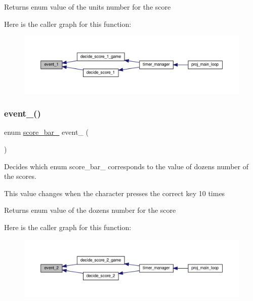 \begin{DoxyReturn}{Returns}
enum value of the units number for the score 
\end{DoxyReturn}
Here is the caller graph for this function\+:
\nopagebreak
\begin{figure}[H]
\begin{center}
\leavevmode
\includegraphics[width=350pt]{group__loading__xpms_ga70f5397af0d313815b96cf662cd48f65_icgraph}
\end{center}
\end{figure}
\mbox{\label{group__loading__xpms_gac00aab23f7677ce5eee5748c335c994f}} 
\subsubsection{\texorpdfstring{event\+\_()}{event\_2()}}
{\footnotesize\ttfamily enum \hyperlink{group__types_gabd8d88ed6ba2aef17eb45496d20be732}{score\+\_\+bar\+\_} event\+\_ (\begin{DoxyParamCaption}{ }\end{DoxyParamCaption})}



Decides which enum score\+\_\+bar\+\_ corresponds to the value of dozens number of the scores. 

This value changes when the character presses the correct key 10 times

\begin{DoxyReturn}{Returns}
enum value of the dozens number for the score 
\end{DoxyReturn}
Here is the caller graph for this function\+:
\nopagebreak
\begin{figure}[H]
\begin{center}
\leavevmode
\includegraphics[width=350pt]{group__loading__xpms_gac00aab23f7677ce5eee5748c335c994f_icgraph}
\end{center}
\end{figure}
\mbox{\label{group__loading__xpms_ga462cc2177dd9b043e5bd5689bbeaf868}} 
